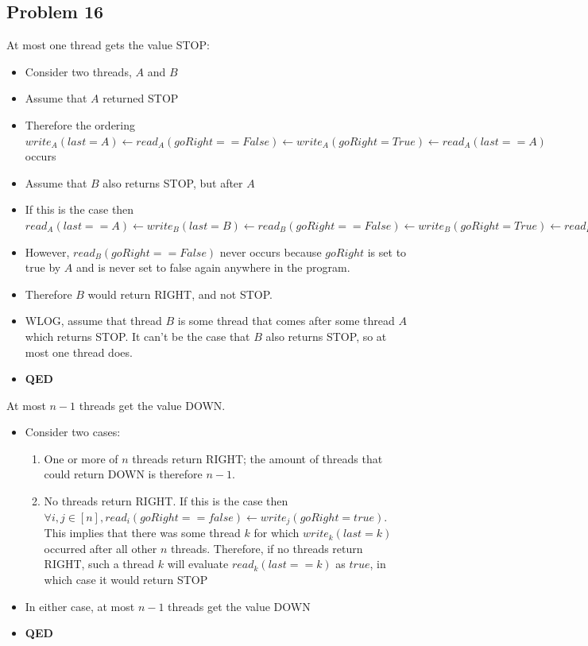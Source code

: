 \documentclass[]{article}
\begin{document}
\subsection{Problem 16}
At most one thread gets the value STOP:
\begin{itemize}
	\item Consider two threads, $A$ and $B$
	\item Assume that $A$ returned STOP
	\item Therefore the ordering $write_A(last = A) \leftarrow read_A(goRight == False)\leftarrow write_A(goRight = True) \leftarrow read_A(last == A)$ occurs
	\item Assume that $B$ also returns STOP, but after $A$
	\item If this is the case then $read_A(last == A) \leftarrow write_B(last = B) \leftarrow read_B(goRight == False) \leftarrow write_B(goRight = True) \leftarrow read_B(last == B)$
	\item However, $read_B(goRight == False)$ never occurs because $goRight$ is set to true by $A$ and is never set to false again anywhere in the program.
	\item Therefore $B$ would return RIGHT, and not STOP.
	\item WLOG, assume that thread $B$ is some thread that comes after some thread $A$ which returns STOP. It can't be the case that $B$ also returns STOP, so at most one thread does.
	\item \textbf{QED}
\end{itemize}
At most $n - 1$ threads get the value DOWN.
\begin{itemize}
	\item Consider two cases:
	\begin{enumerate}
		\item One or more of $n$ threads return RIGHT; the amount of threads that could return DOWN is therefore $n - 1$.
		\item No threads return RIGHT. If this is the case then $\forall i, j \in [n], read_i(goRight == false) \leftarrow write_j(goRight = true)$. This implies that there was some thread $k$ for which $write_k(last = k)$ occurred after all other $n$ threads. Therefore, if no threads return RIGHT, such a thread $k$ will evaluate $read_k(last == k)$ as $true$, in which case it would return STOP
	\end{enumerate}
	\item In either case, at most $n - 1$ threads get the value DOWN
	\item \textbf{QED}
\end{itemize}
\end{document}
